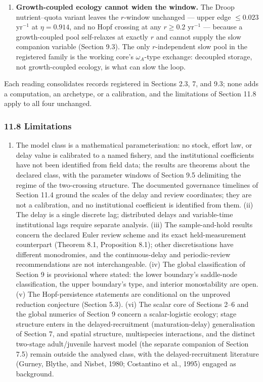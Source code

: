 \documentclass[11pt]{article}
\providecommand{\tightlist}{\setlength{\itemsep}{0pt}\setlength{\parskip}{0pt}}
\begin{document}
\begin{enumerate}
  time \(430\) (Section 9.3). Local spectra cannot see the extraction
  form; the excursion record can.
\item
  \textbf{Growth-coupled ecology cannot widen the window.} The Droop
  nutrient--quota variant leaves the \(r\)-window unchanged --- upper
  edge \(\le 0.023\) yr\(^{-1}\) at \(\eta = 0.914\), and no Hopf
  crossing at any \(r \ge 0.2\) yr\(^{-1}\) --- because a growth-coupled
  pool self-relaxes at exactly \(r\) and cannot supply the slow
  companion variable (Section 9.3). The only \(r\)-independent slow pool
  in the registered family is the working core's \(\omega_A\)-type
  exchange: decoupled storage, not growth-coupled ecology, is what can
  slow the loop.
\end{enumerate}

Each reading consolidates records registered in Sections 2.3, 7, and
9.3; none adds a computation, an archetype, or a calibration, and the
limitations of Section 11.8 apply to all four unchanged.

\subsubsection{11.8 Limitations}\label{limitations}

\begin{enumerate}
\def\labelenumi{(\roman{enumi})}
\tightlist
\item
  The model class is a mathematical parameterisation: no stock, effort
  law, or delay value is calibrated to a named fishery, and the
  institutional coefficients have not been identified from field data;
  the results are theorems about the declared class, with the parameter
  windows of Section 9.5 delimiting the regime of the two-crossing
  structure. The documented governance timelines of Section 11.4 ground
  the scales of the delay and review coordinates; they are not a
  calibration, and no institutional coefficient is identified from them.
  (ii) The delay is a single discrete lag; distributed delays and
  variable-time institutional lags require separate analysis. (iii) The
  sample-and-hold results concern the declared Euler review scheme and
  its exact held-measurement counterpart (Theorem 8.1, Proposition 8.1);
  other discretisations have different monodromies, and the
  continuous-delay and periodic-review recommendations are not
  interchangeable. (iv) The global classification of Section 9 is
  provisional where stated: the lower boundary's saddle-node
  classification, the upper boundary's type, and interior monostability
  are open. (v) The Hopf-persistence statements are conditional on the
  unproved reduction conjecture (Section 5.3). (vi) The scalar core of
  Sections 2--6 and the global numerics of Section 9 concern a
  scalar-logistic ecology; stage structure enters in the
  delayed-recruitment (maturation-delay) generalisation of Section 7,
  and spatial structure, multispecies interactions, and the distinct
  two-stage adult/juvenile harvest model (the separate companion of
  Section 7.5) remain outside the analysed class, with the
  delayed-recruitment literature (Gurney, Blythe, and Nisbet, 1980;
  Costantino et al., 1995) engaged as background.
\end{enumerate}
\end{document}
